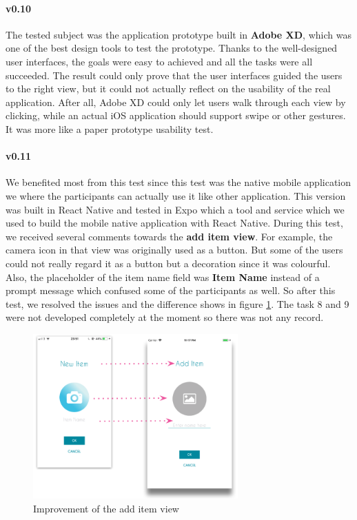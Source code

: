 \documentclass[12pt,a4paper]{article}
\begin{document}
          \paragraph{v0.10} The tested subject was the application prototype built in {\bf Adobe XD}, which was one of the best design tools to test the prototype. Thanks to the well-designed user interfaces, the goals were easy to achieved and all the tasks were all succeeded. The result could only prove that the user interfaces guided the users to the right view, but it could not actually reflect on the usability of the real application. After all, Adobe XD could only let users walk through each view by clicking, while an actual iOS application should support swipe or other gestures. It was more like a paper prototype usability test.
          
          \paragraph{v0.11} We benefited most from this test since this test was the native mobile application we where the participants can actually use it like other application. This version was built in React Native and tested in Expo which a tool and service which we used to build the mobile native application with React Native. During this test, we received several comments towards the {\bf add item view}. For example, the camera icon in that view was originally used as a button. But some of the users could not really regard it as a button but a decoration since it was colourful. Also, the placeholder of the item name field was {\bf Item Name} instead of a prompt message which confused some of the participants as well. So after this test, we resolved the issues and the difference shows in figure \ref{fig:usability-test-ios-v010-improvements}. The task 8 and 9 were not developed completely at the moment so there was not any record.

          \begin{figure}[H]
            \centering
            \includegraphics[width=0.7\textwidth]{../assets/usability-test-ios-v010-improvements.png}
            \caption{Improvement of the add item view}
            \label{fig:usability-test-ios-v010-improvements}
          \end{figure}
\end{document}
